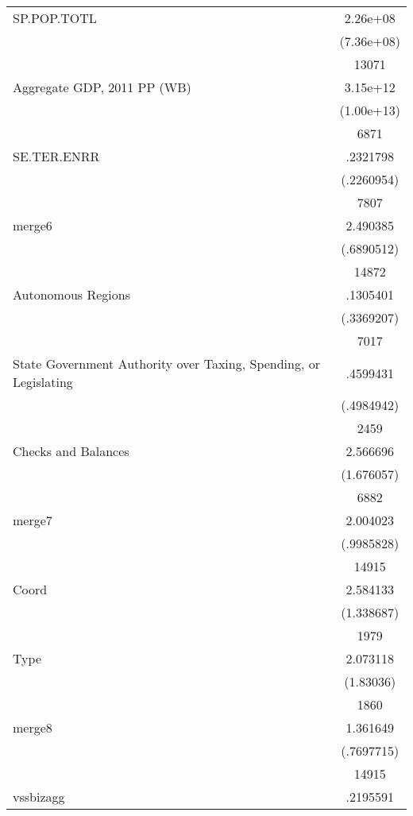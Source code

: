 {\begin{longtable}{l*{1}{c}}
SP.POP.TOTL         &    2.26e+08\\
                    &  (7.36e+08)\\
                    &       13071\\
Aggregate GDP, 2011 PP (WB)&    3.15e+12\\
                    &  (1.00e+13)\\
                    &        6871\\
SE.TER.ENRR         &    .2321798\\
                    &  (.2260954)\\
                    &        7807\\
merge6              &    2.490385\\
                    &  (.6890512)\\
                    &       14872\\
Autonomous Regions  &    .1305401\\
                    &  (.3369207)\\
                    &        7017\\
State Government Authority over Taxing, Spending, or Legislating&    .4599431\\
                    &  (.4984942)\\
                    &        2459\\
Checks and Balances &    2.566696\\
                    &  (1.676057)\\
                    &        6882\\
merge7              &    2.004023\\
                    &  (.9985828)\\
                    &       14915\\
Coord               &    2.584133\\
                    &  (1.338687)\\
                    &        1979\\
Type                &    2.073118\\
                    &   (1.83036)\\
                    &        1860\\
merge8              &    1.361649\\
                    &  (.7697715)\\
                    &       14915\\
vssbizagg           &    .2195591\\

\end{longtable}}
